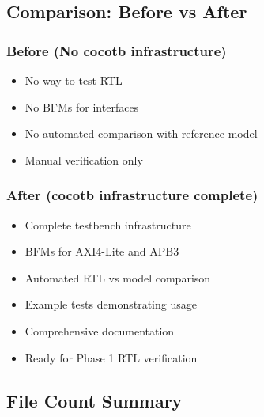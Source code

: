 \subsection{Comparison: Before vs After}\label{cr:app:archive-cocotb-setup-summary:comparison-before-vs-after}

\subsubsection{Before (No cocotb infrastructure)}\label{cr:app:archive-cocotb-setup-summary:before-no-cocotb-infrastructure}

\begin{record}

\begin{itemize}
\tightlist
\item
  \bad{} No way to test RTL
\item
  \bad{} No BFMs for interfaces
\item
  \bad{} No automated comparison with reference model
\item
  \bad{} Manual verification only
\end{itemize}

\end{record}

\subsubsection{After (cocotb infrastructure complete)}\label{cr:app:archive-cocotb-setup-summary:after-cocotb-infrastructure-complete}

\begin{record}

\begin{itemize}
\tightlist
\item
  \ok{} Complete testbench infrastructure
\item
  \ok{} BFMs for AXI4-Lite and APB3
\item
  \ok{} Automated RTL vs model comparison
\item
  \ok{} Example tests demonstrating usage
\item
  \ok{} Comprehensive documentation
\item
  \ok{} Ready for Phase 1 RTL verification
\end{itemize}

\end{record}

\subsection{File Count Summary}\label{cr:app:archive-cocotb-setup-summary:file-count-summary}

